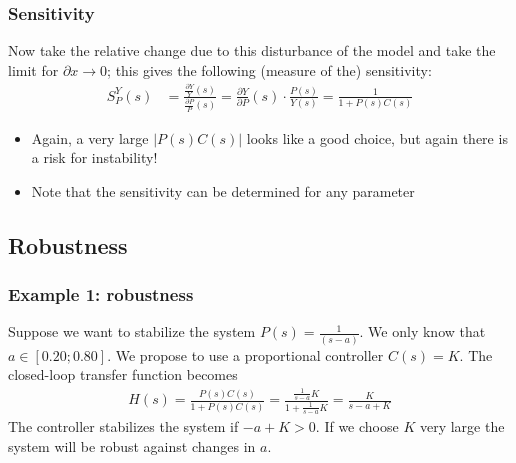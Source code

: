 \begin{frame}
	\frametitle{Sensitivity}
	\begin{alertblock}{}
		Now take the relative change due to this disturbance of the model and take the limit for $\partial x \rightarrow 0$; this gives the following (measure of the) sensitivity:
		\begin{align*}
			S_P^Y(s) &= \frac{\frac{\partial Y}{Y}(s)}{\frac{\partial P}{P}(s)} = \frac{\partial Y}{\partial P}\left(s\right) \cdot \frac{P(s)}{Y(s)} = \frac{1}{1 + P(s)C(s)}
		\end{align*}
	\end{alertblock}
	\begin{block}{}
		\begin{itemize}
			\item Again, a very large $\left|P(s)C(s)\right|$ looks like a good choice, but again there is a risk for instability!
			\item Note that the sensitivity can be determined for any parameter	
		\end{itemize}
	\end{block}
\end{frame}


\subsection[Robustness]{Robustness}
\begin{frame}
	\frametitle{Example 1: robustness}
	\begin{example}{}
		Suppose we want to stabilize the system $P(s)=\frac{1}{(s - a)}$.  We only know that $a \in [0.20;0.80]$. We propose to use a proportional controller $C(s)=K$.
		The closed-loop transfer function becomes
		\begin{align*}
			H(s) = \frac{P(s)C(s)}{1+P(s)C(s)} = \frac{\frac{1}{s-a}K}{1+\frac{1}{s-a}K} = \frac{K}{s-a+K}
		\end{align*}
		The controller stabilizes the system if $ - a+K>0$. If we choose $K$ very large the system will be robust against changes in $a$.
		
	\end{example}
\end{frame}


